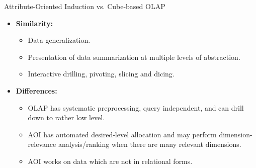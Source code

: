 \begin{frame}{Attribute-Oriented Induction vs. Cube-based OLAP}
	\begin{itemize}
		\item \textbf{Similarity:}
		      \begin{itemize}
			      \item Data generalization.
			      \item Presentation of data summarization at multiple levels of abstraction.
			      \item Interactive drilling, pivoting, slicing and dicing.
		      \end{itemize}
		\item \textbf{Differences:}
		      \begin{itemize}
			      \item OLAP has systematic preprocessing, query independent, and can drill down to rather low level.
			      \item AOI has automated desired-level allocation and may perform dimension-relevance analysis/ranking when there are many relevant dimensions.
			      \item AOI works on data which are not in relational forms.
		      \end{itemize}
	\end{itemize}
\end{frame}
